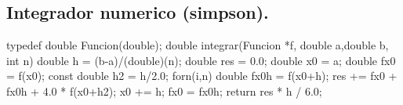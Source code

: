 \documentclass[10pt,landscape,twocolumn,a4paper,notitlepage]{article}
\begin{document}
\subsection{Integrador numerico (simpson).}
\begin{code}
typedef double Funcion(double);
double integrar(Funcion *f, double a,double b, int n) {
	double h = (b-a)/(double)(n);
	double res = 0.0;
	double x0 = a;
	double fx0 = f(x0);
	const double h2 = h/2.0;
	forn(i,n) {
		double fx0h = f(x0+h);
		res += fx0 + fx0h + 4.0 * f(x0+h2);
		x0 += h;
		fx0 = fx0h;
	}
	return res * h / 6.0;
}
\end{code}
% 
% 
\end{document}
